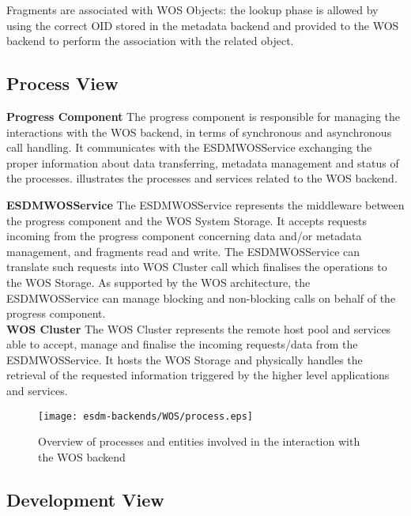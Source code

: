 Fragments are associated with WOS Objects: the lookup phase is allowed by using the correct OID stored in the metadata backend and provided to the WOS backend to perform the association with the related object. 


\subsection{Process View}

\textbf{Progress Component} The progress component is responsible for managing the interactions with the WOS backend, in terms of synchronous and asynchronous call handling. It communicates with the ESDM\textunderscore WOS\textunderscore Service exchanging the proper information about data transferring, metadata management and status of the processes.
 illustrates the processes and services related to the WOS backend.

\textbf{ESDM\textunderscore WOS\textunderscore Service} The ESDM\textunderscore WOS\textunderscore Service represents the middleware between the progress component and the WOS System Storage. It accepts requests incoming from the progress component concerning data and/or metadata management, and fragments read and write. The ESDM\textunderscore WOS\textunderscore Service can translate such requests into WOS Cluster call which finalises the operations to the WOS Storage. As supported by the WOS architecture, the ESDM\textunderscore WOS\textunderscore Service can manage blocking and non-blocking calls on behalf of the progress component.\\

\textbf{WOS Cluster} The WOS Cluster represents the remote host pool and services able to accept, manage and finalise the incoming requests/data from the ESDM\textunderscore WOS\textunderscore Service. It hosts the WOS Storage and physically handles the retrieval of the requested information triggered by the higher level applications and services.

\begin{figure}
	\centering
	\texttt{[image: esdm-backends/WOS/process.eps]}
	\caption{Overview of processes and entities involved in the interaction with the WOS backend}
	\label{fig:WOS backend process view}
\end{figure}


\subsection{Development View}

